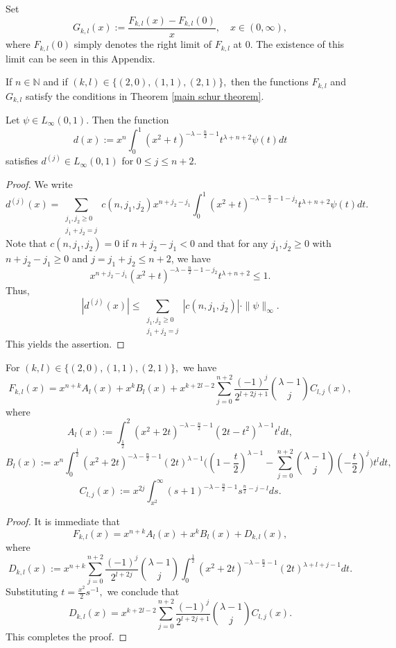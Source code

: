 \documentclass[12pt]{amsart}
\begin{document}
Set
$$G_{k,l}(x):=\frac{F_{k,l}(x)-F_{k,l}(0)}{x},\quad x\in(0,\infty),$$
where $F_{k,l}(0)$ {\color{blue}simply denotes} the right limit of $F_{k,l}$ at $0$. The existence of this limit can be seen in this Appendix.
\begin{theorem}\label{fkl are smooth theorem} If $n\in\mathbb{N}$ and if $(k,l)\in\{(2,0),(1,1),(2,1)\},$ then the functions $F_{k,l}$ and $G_{k,l}$ satisfy the conditions in Theorem \ref{main schur theorem}.
\end{theorem}

\begin{lemma}\label{first fkl lemma} Let $\psi\in L_{\infty}(0,1).$ Then the function
$$d(x):=x^n\int_0^1(x^2+t)^{-\lambda-\frac{n}{2}-1}t^{\lambda+n+2}\psi(t)dt$$
satisfies $d^{(j)}\in L_{\infty}(0,1)$ for $0\leq j\leq n+2.$
\end{lemma}
\begin{proof} We write
$$d^{(j)}(x)=\sum_{\substack{j_1,j_2\geq0\\ j_1+j_2=j}}c(n,j_1,j_2)x^{n+j_2-j_1}\int_0^1(x^2+t)^{-\lambda-\frac{n}{2}-1-j_2}t^{\lambda+n+2}\psi(t)dt.$$
Note that $c(n,j_1,j_2)=0$ if $n+j_2-j_1<0$ and that for any $j_1,j_2\geq0$ with $n+j_2-j_1\geq 0$ and $j=j_1+j_2\leq n+2$, we have
$$x^{n+j_2-j_1}(x^2+t)^{-\lambda-\frac{n}{2}-1-j_2}t^{\lambda+n+2}\leq 1.$$
Thus,
$$|d^{(j)}(x)|\leq \sum_{\substack{j_1,j_2\geq0\\ j_1+j_2=j}}|c(n,j_1,j_2)|\cdot \|\psi\|_{\infty}.$$
This yields the assertion.
\end{proof}

\begin{lemma}\label{second fkl lemma} For $(k,l)\in\{(2,0),(1,1),(2,1)\},$ we have
$$F_{k,l}(x)=x^{n+k}A_l(x)+x^kB_l(x)+x^{k+2l-2}\sum_{j=0}^{n+2}\frac{(-1)^j}{2^{l+2j+1}}\binom{\lambda-1}{j}C_{l,j}(x),$$
where
$$A_l(x):=\int_{\frac12}^2(x^2+2t)^{-\lambda-\frac{n}{2}-1}(2t-t^2)^{\lambda-1}t^ldt,$$
$$B_l(x):=x^n\int_0^{\frac12}(x^2+2t)^{-\lambda-\frac{n}{2}-1}(2t)^{\lambda-1}\Big((1-\frac{t}{2})^{\lambda-1}-\sum_{j=0}^{n+2}\binom{\lambda-1}{j}(-\frac{t}{2})^j\Big)t^ldt,$$
$$C_{l,j}(x):=x^{2j}\int_{x^2}^{\infty}(s+1)^{-\lambda-\frac{n}{2}-1}s^{\frac{n}{2}-j-l}ds.$$
\end{lemma}
\begin{proof} It is immediate that
$$F_{k,l}(x)=x^{n+k}A_l(x)+x^kB_l(x)+D_{k,l}(x),$$
where
$$D_{k,l}(x):=x^{n+k}\sum_{j=0}^{n+2}\frac{(-1)^j}{2^{l+2j}}\binom{\lambda-1}{j}\int_0^{\frac12}(x^2+2t)^{-\lambda-\frac{n}{2}-1}(2t)^{\lambda+l+j-1}dt.$$
Substituting $t=\frac{x^2}{2}s^{-1},$ we conclude that
$$D_{k,l}(x)=x^{k+2l-2}\sum_{j=0}^{n+2}\frac{(-1)^j}{2^{l+2j+1}}\binom{\lambda-1}{j}C_{l,j}(x).$$
This completes the proof.
\end{proof}
\end{document}
